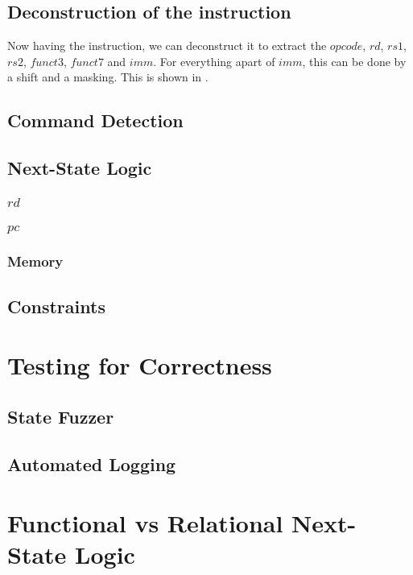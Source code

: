 \subsection{Deconstruction of the instruction}
Now having the instruction, we can deconstruct it to extract the $opcode$, $rd$, $rs1$, $rs2$, $funct3$, $funct7$ and $imm$.
For everything apart of $imm$, this can be done by a shift and a masking. This is shown in .



\subsection{Command Detection}
\subsection{Next-State Logic}
\subsubsection{$rd$}
\subsubsection{$pc$}
\subsubsection{Memory}
\subsection{Constraints}
\section{Testing for Correctness}\label{sec:corectness}
\subsection{State Fuzzer}
\subsection{Automated Logging}

\section{Functional vs Relational Next-State Logic}\label{sec:funcVSrel}